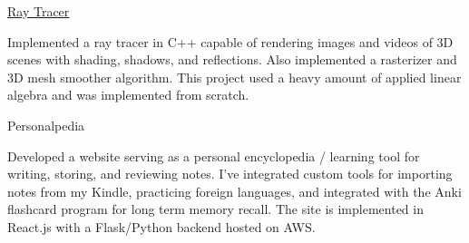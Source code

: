 \begin{cventries}
  \cventry
    {} %
    {\href{https://github.com/dangbert/raytracer/tree/master}{Ray Tracer}} %
    {} %
    {} %
    {
      \begin{cvitems} %
      \item {Implemented a ray tracer in C++ capable of rendering images and videos of 3D scenes with shading, shadows, and reflections.  Also implemented a rasterizer and 3D mesh smoother algorithm.  This project used a heavy amount of applied linear algebra and was implemented from scratch.}
      \end{cvitems}
    }

  \cventry
    {} %
    {Personalpedia} %
    {} %
    {} %
    {
      \begin{cvitems} %
      \item {Developed a website serving as a personal encyclopedia / learning tool for writing, storing, and reviewing notes.  I've integrated custom tools for importing notes from my Kindle, practicing foreign languages, and integrated with the Anki flashcard program for long term memory recall.  The site is implemented in React.js with a Flask/Python backend hosted on AWS.}
      \end{cvitems}
    }

\end{cventries}
